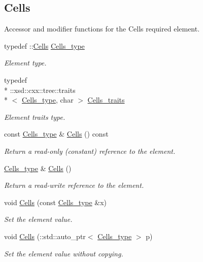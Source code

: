 \subsection*{Cells}
\label{_amgrp56284b76007b9f31cdec47174c4de6af}%
Accessor and modifier functions for the Cells required element. \begin{DoxyCompactItemize}
\item 
typedef \+::\hyperlink{classCells}{Cells} \hyperlink{classPieceUnstructuredGrid__t_aca1ec38eff08bde0cd115c54dbb7a20f}{Cells\+\_\+type}
\begin{DoxyCompactList}\small\item\em Element type. \end{DoxyCompactList}\item 
typedef \\*
\+::xsd\+::cxx\+::tree\+::traits\\*
$<$ \hyperlink{classPieceUnstructuredGrid__t_aca1ec38eff08bde0cd115c54dbb7a20f}{Cells\+\_\+type}, char $>$ \hyperlink{classPieceUnstructuredGrid__t_a33252b6f55b5ae830ceecdf9be42cce1}{Cells\+\_\+traits}
\begin{DoxyCompactList}\small\item\em Element traits type. \end{DoxyCompactList}\item 
const \hyperlink{classPieceUnstructuredGrid__t_aca1ec38eff08bde0cd115c54dbb7a20f}{Cells\+\_\+type} \& \hyperlink{classPieceUnstructuredGrid__t_a398de7c2f319c1785810e18f6b43831e}{Cells} () const 
\begin{DoxyCompactList}\small\item\em Return a read-\/only (constant) reference to the element. \end{DoxyCompactList}\item 
\hyperlink{classPieceUnstructuredGrid__t_aca1ec38eff08bde0cd115c54dbb7a20f}{Cells\+\_\+type} \& \hyperlink{classPieceUnstructuredGrid__t_a49e65eacff6577cd353fa15a09febf86}{Cells} ()
\begin{DoxyCompactList}\small\item\em Return a read-\/write reference to the element. \end{DoxyCompactList}\item 
void \hyperlink{classPieceUnstructuredGrid__t_a366f0cff854ef350eb1be9da22df6d14}{Cells} (const \hyperlink{classPieceUnstructuredGrid__t_aca1ec38eff08bde0cd115c54dbb7a20f}{Cells\+\_\+type} \&x)
\begin{DoxyCompactList}\small\item\em Set the element value. \end{DoxyCompactList}\item 
void \hyperlink{classPieceUnstructuredGrid__t_ab90d26fbc66b1b669b7bfa7a50a6b069}{Cells} (\+::std\+::auto\+\_\+ptr$<$ \hyperlink{classPieceUnstructuredGrid__t_aca1ec38eff08bde0cd115c54dbb7a20f}{Cells\+\_\+type} $>$ p)
\begin{DoxyCompactList}\small\item\em Set the element value without copying. \end{DoxyCompactList}\end{DoxyCompactItemize}
